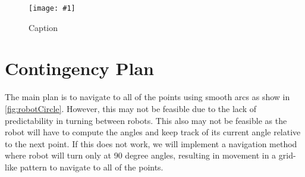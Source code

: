 \documentclass[12pt,conference,onecolumn]{IEEEtran} %
\newcommand{\myfigure}[4]{
  \begin{figure}[h!]
      \centering
      \texttt{[image: \#1]}
      \caption{#2}
\label{#4}
    \end{figure}
}
\begin{document}
\myfigure{images/GanttChart.PNG}{Caption}{1}{fig:gantt}

\section{Contingency Plan}
The main plan is to navigate to all of the points using smooth arcs as show in \cref{fig:robotCircle}. However, this may not be feasible due to the lack of predictability in turning between robots. This also may not be feasible as the robot will have to compute the angles and keep track of its current angle relative to the next point. If this does not work, we will implement a navigation method where robot will turn only at 90 degree angles, resulting in movement in a grid-like pattern to navigate to all of the points.

\pagebreak
\printbibliography{}
\end{document}
